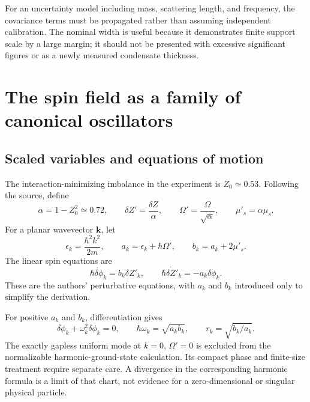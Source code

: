 \documentclass[11pt,a4paper]{article}
\theoremstyle{definition}
\theoremstyle{remark}
\newcommand{\musp}{\mu'_s}
\begin{document}
For an uncertainty model including mass, scattering length, and frequency, the covariance terms must be propagated rather than assuming independent calibration. The nominal width is useful because it demonstrates finite support scale by a large margin; it should not be presented with excessive significant figures or as a newly measured condensate thickness.

\section{The spin field as a family of canonical oscillators}
\label{sec:spin}
\subsection{Scaled variables and equations of motion}
The interaction-minimizing imbalance in the experiment is $Z_0\simeq0.53$. Following the source, define
\begin{equation}
 \alpha=1-Z_0^2\simeq0.72,\qquad
 \delta Z'=\frac{\delta Z}{\alpha},\qquad
 \Omega'=\frac{\Omega}{\sqrt\alpha},\qquad
 \musp=\alpha\mu_s.
 \label{eq:scaled}
\end{equation}
For a planar wavevector $\boldsymbol k$, let
\begin{equation}
 \epsilon_k=\frac{\hbar^2k^2}{2m},\qquad
 a_k=\epsilon_k+\hbar\Omega',\qquad
 b_k=a_k+2\musp.
 \label{eq:ab}
\end{equation}
The linear spin equations are
\begin{equation}
 \hbar\dot{\delta\phi}_k=b_k\delta Z'_k,
 \qquad
 \hbar\dot{\delta Z'}_k=-a_k\delta\phi_k.
 \label{eq:spin_motion}
\end{equation}
These are the authors' perturbative equations, with $a_k$ and $b_k$ introduced only to simplify the derivation.\cite{zhang2026}

For positive $a_k$ and $b_k$, differentiation gives
\begin{equation}
 \ddot{\delta\phi}_k+\omega_k^2\delta\phi_k=0,
 \qquad \hbar\omega_k=\sqrt{a_kb_k},\qquad
 r_k=\sqrt{b_k/a_k}.
 \label{eq:dispersion}
\end{equation}
The exactly gapless uniform mode at $k=0$, $\Omega'=0$ is excluded from the normalizable harmonic-ground-state calculation. Its compact phase and finite-size treatment require separate care. A divergence in the corresponding harmonic formula is a limit of that chart, not evidence for a zero-dimensional or singular physical particle.
\end{document}
